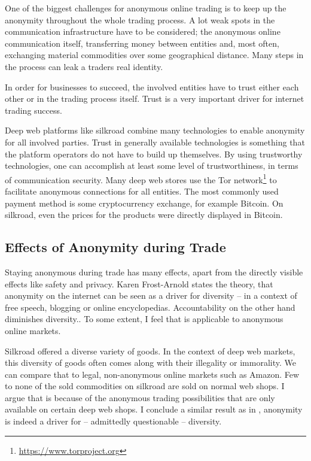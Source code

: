 One of the biggest challenges for anonymous online trading is to keep up the anonymity throughout the whole trading process. A lot weak spots in the communication infrastructure have to be considered; the anonymous online communication itself, transferring money between entities and, most often, exchanging material commodities over some geographical distance. Many steps in the process can leak a traders real identity.

In order for businesses to succeed, the involved entities have to trust either each other or in the trading process itself. Trust is a very important driver for internet trading success\cite{internetTrust2004}.

Deep web platforms like silkroad\cite{silkroad2013} combine many technologies to enable anonymity for all involved parties. Trust in generally available technologies is something that the platform operators do not have to build up themselves. By using trustworthy technologies, one can accomplish at least some level of trustworthiness, in terms of communication security. Many deep web stores use the Tor network\footnote{\url{https://www.torproject.org}} to facilitate anonymous connections for all entities\cite{silkroad2013}. The most commonly used payment method is some cryptocurrency exchange, for example Bitcoin. On silkroad, even the prices for the products were directly displayed in Bitcoin\cite{silkroad2013}.

\subsection{Effects of Anonymity during Trade}

Staying anonymous during trade has many effects, apart from the directly visible effects like safety and privacy. Karen Frost-Arnold states the theory, that anonymity on the internet can be seen as a driver for diversity -- in a context of free speech, blogging or online encyclopedias. Accountability on the other hand diminishes diversity.\cite{accountability2014}. To some extent, I feel that is applicable to anonymous online markets.

Silkroad offered a diverse variety of goods. In the context of deep web markets, this diversity of goods often comes along with their illegality or immorality\cite{silkroad2013}. We can compare that to legal, non-anonymous online markets such as Amazon. Few to none of the sold commodities on silkroad are sold on normal web shops. I argue that is because of the anonymous trading possibilities that are only available on certain deep web shops. I conclude a similar result as in \cite{accountability2014}, anonymity is indeed a driver for -- admittedly questionable -- diversity. 

